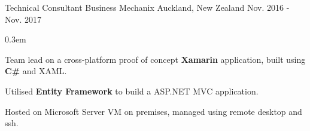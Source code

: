 \begin{cventries}
  \cventry
    {Technical Consultant} %
    {Business Mechanix} %
    {Auckland, New Zealand} %
    {Nov. 2016 - Nov. 2017} %
    {
      \begin{cvitems2} %
        \itemsep0.3em
        \item {Team lead on a cross-platform proof of concept \textbf{Xamarin} application, built using \textbf{C\#} and XAML.}
        \item {Utilised \textbf{Entity Framework} to build a ASP.NET MVC application.}
        \item {Hosted on Microsoft Server VM on premises, managed using remote desktop and ssh.}
      \end{cvitems2}
    }
    
\end{cventries}
